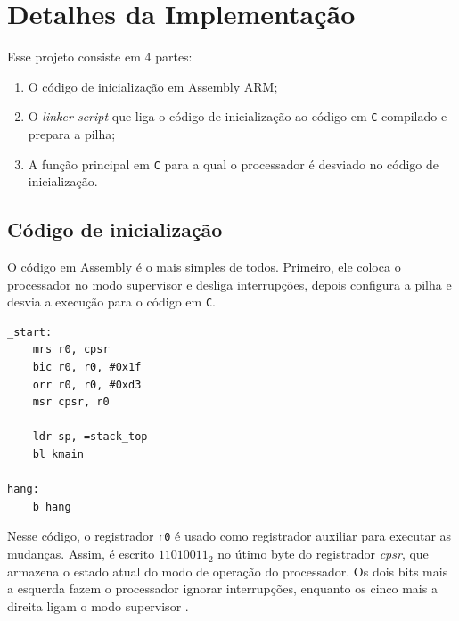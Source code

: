 \section{Detalhes da Implementação}
%
%

Esse projeto consiste em 4 partes:

\begin{enumerate}
    \item O código de inicialização em Assembly ARM;
    \item O \textit{linker script} que liga o código de inicialização ao código em \verb|C| compilado e prepara a pilha;
    \item A função principal em \verb|C| para a qual o processador é desviado no código de inicialização.
\end{enumerate}

\subsection{Código de inicialização}

O código em Assembly é o mais simples de todos. Primeiro, ele coloca o processador no modo supervisor e desliga interrupções, depois configura a pilha e desvia a execução para o código em \verb|C|.

\begin{lstlisting}[caption=Configuração do modo do processador\, da pilha e chamada a kmain().]
_start:
    mrs r0, cpsr
    bic r0, r0, #0x1f
    orr r0, r0, #0xd3
    msr cpsr, r0

    ldr sp, =stack_top
    bl kmain

hang:
    b hang
\end{lstlisting}

Nesse código, o registrador \verb|r0| é usado como registrador auxiliar para executar as mudanças. Assim, é escrito $11010011_2$ no útimo byte do registrador \textit{cpsr}, que armazena o estado atual do modo de operação do processador. Os dois bits mais a esquerda fazem o processador ignorar interrupções, enquanto os cinco mais a direita ligam o modo supervisor \cite{arm:armv7ar}.

